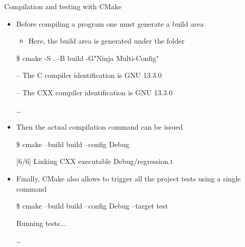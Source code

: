 \begin{frame}{Compilation and testing with CMake}
  \begin{itemize}[<+->]
  \item Before compiling a program one must generate a build area
    \begin{itemize}[<.->]
    \item Here, the build area is generated under the  folder
    \end{itemize}
    \begin{shellblock}{
\$ cmake -S . -B build -G"Ninja Multi-Config"

-- The C compiler identification is GNU 13.3.0

-- The CXX compiler identification is GNU 13.3.0

\ldots    
}\end{shellblock}
  \item Then the actual compilation command can be issued
    \begin{shellblock}{
\$ cmake --build build --config Debug

[6/6] Linking CXX executable Debug/regression.t
}\end{shellblock}
  \item Finally, CMake also allows to trigger all the project tests using a
  single command
    \begin{shellblock}{
\$ cmake --build build --config Debug --target test

Running tests...

\ldots    
}\end{shellblock}

\end{itemize}
\end{frame}
